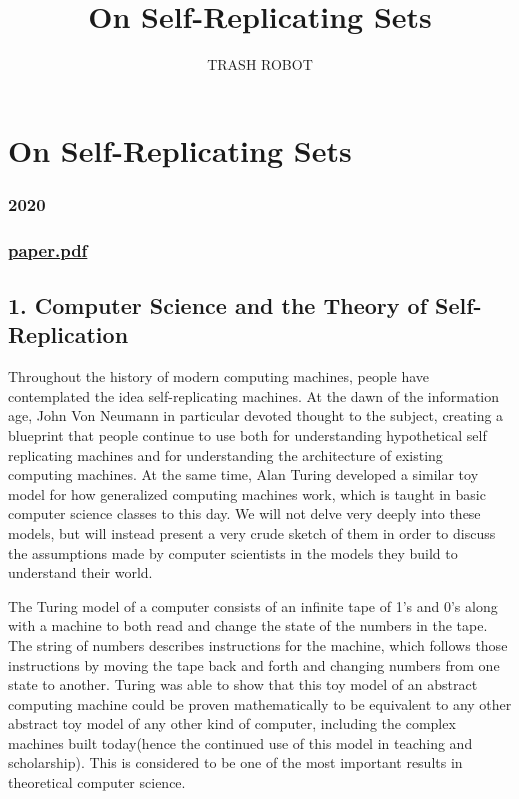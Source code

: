 \documentclass[12pt,a4paper]{amsart}
\numberwithin{equation}{section}
\begin{document}
\title{On Self-Replicating Sets}

\author{TRASH ROBOT}

\maketitle
\section{On Self-Replicating Sets}\label{on-self-replicating-sets}


\subsubsection{2020}\label{section}


\subsubsection{\texorpdfstring{\url{paper.pdf}}{paper.pdf}}\label{paper.pdf}

\subsection{1. Computer Science and the Theory of
Self-Replication}\label{computer-science-and-the-theory-of-self-replication}

Throughout the history of modern computing machines, people have
contemplated the idea self-replicating machines. At the dawn of the
information age, John Von Neumann in particular devoted thought to the
subject, creating a blueprint that people continue to use both for
understanding hypothetical self replicating machines and for
understanding the architecture of existing computing machines. At the
same time, Alan Turing developed a similar toy model for how generalized
computing machines work, which is taught in basic computer science
classes to this day. We will not delve very deeply into these models,
but will instead present a very crude sketch of them in order to discuss
the assumptions made by computer scientists in the models they build to
understand their world.

The Turing model of a computer consists of an infinite tape of 1's and
0's along with a machine to both read and change the state of the
numbers in the tape. The string of numbers describes instructions for
the machine, which follows those instructions by moving the tape back
and forth and changing numbers from one state to another. Turing was
able to show that this toy model of an abstract computing machine could
be proven mathematically to be equivalent to any other abstract toy
model of any other kind of computer, including the complex machines
built today(hence the continued use of this model in teaching and
scholarship). This is considered to be one of the most important results
in theoretical computer science.
\end{document}
